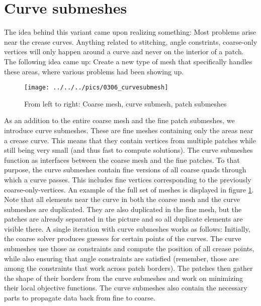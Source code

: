 \documentclass[a4paper,twoside,12pt,nochapterprefix]{scrbook}
\begin{document}
\section{Curve submeshes}\label{sec:curve_submeshes}
The idea behind this variant came upon realizing something: Most problems arise near the crease curves. Anything related to stitching, angle constrints, coarse-only vertices will only happen around a curve and never on the interior of a patch. The following idea came up: Create a new type of mesh that specifically handles these areas, where various problems had been showing up.\newline
\begin{figure}
    \centering
    \texttt{[image: ../../../pics/0306\_curvesubmesh]}
    \caption{From left to right: Coarse mesh, curve submesh, patch submeshes}
      \label{fig:curve_submesh}
\end{figure}
As an addition to the entire coarse mesh and the fine patch submeshes, we introduce curve submeshes. These are fine meshes containing only the areas near a crease curve. This means that they contain vertices from multiple patches while still being very small (and thus fast to compute solutions). The curve submeshes function as interfaces between the coarse mesh and the fine patches. To that purpose, the curve submeshes contain fine versions of all coarse quads through which a curve passes. This includes fine vertices corresponding to the previously coarse-only-vertices. An example of the full set of meshes is displayed in figure \ref{fig:curve_submesh}. Note that all elements near the curve in both the coarse mesh and the curve submeshes are duplicated. They are also duplicated in the fine mesh, but the patches are already separated in the picture and so all duplicate elements are visible there.\newline
A single iteration with curve submeshes works as follows: Initially, the coarse solver produces guesses for certain points of the curves. The curve submeshes use those as constraints and compute the position of all crease points, while also ensuring that angle constraints are satisfied (remember, those are among the constraints that work across patch borders). The patches then gather the shape of their borders from the curve submeshes and work on minimizing their local objective functions. The curve submeshes also contain the necessary parts to propagate data back from fine to coarse.\newline
\end{document}
